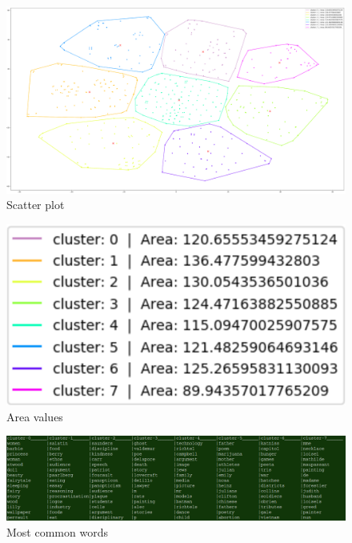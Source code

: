 \documentclass{article}
\begin{document}
\begin{figure}[!hb]
  \includegraphics[width=\linewidth]{scatter.png}
  \caption{Scatter plot}
\end{figure}

\begin{figure}[!h]
  \includegraphics[width=\linewidth]{area.png}
  \caption{Area values}
\end{figure}

\begin{figure}[!h]
  \includegraphics[width=\linewidth]{chart.png}
  \caption{Most common words}
\end{figure}
\end{document}
